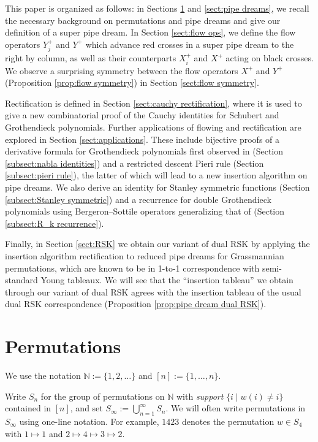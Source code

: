 \documentclass[11pt,reqno]{amsart} %
\newcommand{\bbN}{\mathbb{N}}
\theoremstyle{definition}
\begin{document}
This paper is organized as follows:
in Sections \ref{sect:combinatorics} and \ref{sect:pipe dreams}, we recall the necessary background on permutations and pipe dreams and give our definition of a super pipe dream.
In Section \ref{sect:flow ops}, we define the flow operators $Y_j^+$ and $Y^+$ which advance red crosses in a super pipe dream to the right by column, as well as their counterparts $X_i^+$ and $X^+$ acting on black crosses.
We observe a surprising symmetry between the flow operators $X^+$ and $Y^+$ (Proposition \ref{prop:flow symmetry}) in Section \ref{sect:flow symmetry}.

Rectification is defined in Section \ref{sect:cauchy rectification}, where it is used to give a new combinatorial proof of the Cauchy identities for Schubert and Grothendieck polynomials.
Further applications of flowing and rectification are explored in Section \ref{sect:applications}.
These include bijective proofs of a derivative formula for Grothendieck polynomials first observed in \cite{PechenikSpeyerWeigandt21} (Section \ref{subsect:nabla identities}) and a restricted descent Pieri rule (Section \ref{subsect:pieri rule}), the latter of which will lead to a new insertion algorithm on pipe dreams.
We also derive an identity for Stanley symmetric functions (Section \ref{subsect:Stanley symmetric}) and a recurrence for double Grothendieck polynomials using Bergeron--Sottile operators generalizing that of \cite{NadeauSpinkTewari24} (Section \ref{subsect:R_k recurrence}).

Finally, in Section \ref{sect:RSK} we obtain our variant of dual RSK by applying the insertion algorithm  rectification to reduced pipe dreams for Grassmannian permutations, which are known to be in 1-to-1 correspondence with semi-standard Young tableaux.
We will see that the ``insertion tableau'' we obtain through our variant of dual RSK agrees with the insertion tableau of the usual dual RSK correspondence (Proposition \ref{prop:pipe dream dual RSK}).


\section{Permutations}
\label{sect:combinatorics}

We use the notation $\bbN := \{1,2,\dots\}$ and $[n] := \{1,\dots,n\}$.

Write $S_n$ for the group of permutations on $\bbN$ with \textit{support} $\{i \mid w(i)\neq i\}$ contained in $[n]$, and set $S_\infty := \bigcup_{n=1}^\infty S_n$.
We will often write permutations in $S_\infty$ using one-line notation.
For example, $1423$ denotes the permutation $w\in S_4$ with $1\mapsto 1$ and $2\mapsto 4\mapsto 3\mapsto 2$.
\end{document}
